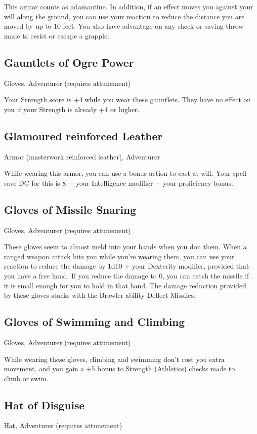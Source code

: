 This armor counts as adamantine. In addition, if an effect moves you against your will along the ground, you can use your reaction to reduce the distance you are moved by up to 10 feet. You also have advantage on any check or saving throw made to resist or escape a grapple.

\subsection{Gauntlets of Ogre Power}
Gloves, Adventurer (requires attunement)

Your Strength score is +4 while you wear these gauntlets. They have no effect on you if your Strength is already +4 or higher.

\subsection{Glamoured reinforced Leather}
Armor (masterwork reinforced leather), Adventurer 

While wearing this armor, you can use a bonus action to cast  at will. Your spell save DC for this is 8 + your Intelligence modifier + your proficiency bonus.

\subsection{Gloves of Missile Snaring}
Gloves, Adventurer (requires attunement) 

These gloves seem to almost meld into your hands when you don them. When a ranged weapon attack hits you while you're wearing them, you can use your reaction to reduce the damage by 1d10 + your Dexterity modifier, provided that you have a free hand. If you reduce the damage to 0, you can catch the missile if it is small enough for you to hold in that hand. The damage reduction provided by these gloves stacks with the Brawler ability Deflect Missiles.

\subsection{Gloves of Swimming and Climbing}
Gloves, Adventurer (requires attunement) 

While wearing these gloves, climbing and swimming don't cost you extra movement, and you gain a +5 bonus to Strength (Athletics) checks made to climb or swim.

\subsection{Hat of Disguise}
Hat, Adventurer (requires attunement) 

